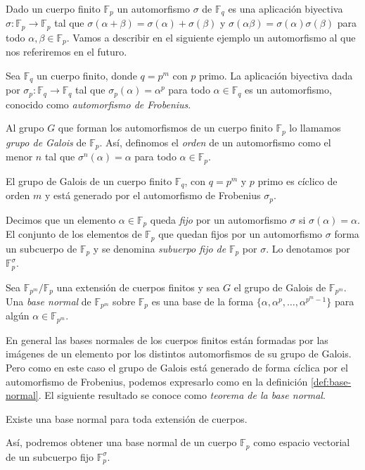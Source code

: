 Dado un cuerpo finito \(\mathbb F_p\) un automorfismo \(\sigma\) de \(\mathbb F_q\) es una aplicación biyectiva \(\sigma: \mathbb F_p \to \mathbb F_p\) tal que \(\sigma(\alpha + \beta) = \sigma(\alpha) + \sigma(\beta)\) y \(\sigma(\alpha \beta) = \sigma(\alpha)\sigma(\beta)\) para todo \(\alpha, \beta \in \mathbb F_p\).
Vamos a describir en el siguiente ejemplo un automorfismo al que nos referiremos en el futuro.

\begin{example}
  Sea \(\mathbb F_q\) un cuerpo finito, donde \(q = p^m\) con \(p\) primo. 
  La aplicación biyectiva dada por \(\sigma_p : \mathbb F_q \to \mathbb F_q\) tal que \(\sigma_p(\alpha) = \alpha^p\) para todo \(\alpha \in \mathbb F_q\) es un automorfismo, conocido como \emph{automorfismo de Frobenius}.
\end{example}

Al grupo \(G\) que forman los automorfismos de un cuerpo finito \(\mathbb F_p\) lo llamamos \emph{grupo de Galois} de \(\mathbb F_p\).
Así, definomos el \emph{orden} de un automorfismo como el menor \(n\) tal que \(\sigma^n(\alpha) = \alpha\) para todo \(\alpha \in \mathbb F_p\).

\begin{theorem}
  El grupo de Galois de un cuerpo finito \(\mathbb F_q\), con \(q = p^m\) y \(p\) primo es cíclico de orden \(m\) y está generado por el automorfismo de Frobenius \(\sigma_p\).
\end{theorem}

Decimos que un elemento \(\alpha \in \mathbb F_p\) queda \emph{fijo} por un automorfismo \(\sigma\) si \(\sigma(\alpha) = \alpha\).
El conjunto de los elementos de \(\mathbb F_p\) que quedan fijos por un automorfismo \(\sigma\) forma un subcuerpo de \(\mathbb F_p\) y se denomina \emph{subuerpo fijo de} \(\mathbb F_p\) por \(\sigma\).
Lo denotamos por \(\mathbb F_p^{\sigma}\).

\begin{definition}
  \label{def:base-normal}
  Sea \(\mathbb F_{p^m}/\mathbb F_p\) una extensión de cuerpos finitos y sea \(G\) el grupo de Galois de \(\mathbb F_{p^m}\). Una \emph{base normal} de \(\mathbb F_{p^m}\) sobre \(\mathbb F_p\) es una base de la forma \(\{\alpha, \alpha^p, \dots, \alpha^{p^m - 1}\}\) para algún \(\alpha \in \mathbb F_{p^m}\).
\end{definition}

En general las bases normales de los cuerpos finitos están formadas por las imágenes de un elemento por los distintos automorfismos de su grupo de Galois.
Pero como en este caso el grupo de Galois está generado de forma cíclica por el automorfismo de Frobenius, podemos expresarlo como en la definición \ref{def:base-normal}.
El siguiente resultado se conoce como \emph{teorema de la base normal}.

\begin{theorem}
  Existe una base normal para toda extensión de cuerpos.
\end{theorem}

Así, podremos obtener una base normal de un cuerpo \(\mathbb F_p\) como espacio vectorial de un subcuerpo fijo \(\mathbb F_p^{\sigma}\).

